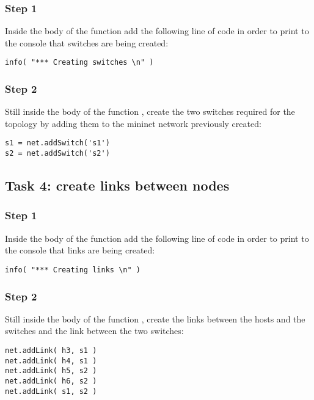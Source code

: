 \subsubsection*{Step 1}
Inside the body of the function  add the following line
of code in order to print to the console that switches are being created:
\begin{lstlisting}
info( "*** Creating switches \n" )
\end{lstlisting}

\subsubsection*{Step 2}
Still inside the body of the function , create the
two switches required for the topology by adding them to the mininet network
previously created:
\begin{lstlisting}
s1 = net.addSwitch('s1')
s2 = net.addSwitch('s2')
\end{lstlisting}







\subsection*{Task 4: create links between nodes}
\subsubsection*{Step 1}
Inside the body of the function  add the following line
of code in order to print to the console that links are being created:
\begin{lstlisting}
info( "*** Creating links \n" )
\end{lstlisting}

\subsubsection*{Step 2}
Still inside the body of the function , create the
links between the hosts and the switches and the link between the two switches:
\begin{lstlisting}
net.addLink( h3, s1 )
net.addLink( h4, s1 )
net.addLink( h5, s2 )
net.addLink( h6, s2 )
net.addLink( s1, s2 )
\end{lstlisting}







